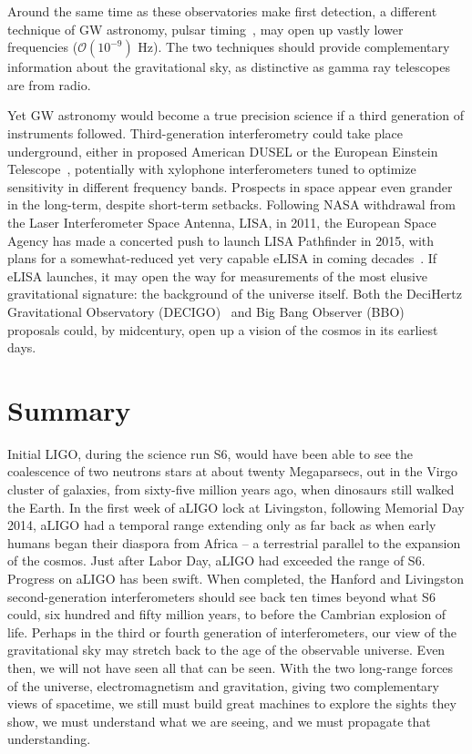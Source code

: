 Around the same time as these observatories make first detection, a different technique of GW astronomy, pulsar timing~\cite{Hobbs2010}, may open up vastly lower frequencies ($\mathcal{O}(10^{-9})$ Hz).
The two techniques should provide complementary information about the gravitational sky, as distinctive as gamma ray telescopes are from radio.

Yet GW astronomy would become a true precision science if a third generation of instruments followed.
Third-generation interferometry could take place underground, either in proposed American DUSEL or the European Einstein Telescope~\cite{Punturo2010}, potentially with xylophone interferometers tuned to optimize sensitivity in different frequency bands.
Prospects in space appear even grander in the long-term, despite short-term setbacks. 
Following NASA withdrawal from the Laser Interferometer Space Antenna, LISA, in 2011, the European Space Agency has made a concerted push to launch LISA Pathfinder in 2015, with plans for a somewhat-reduced yet very capable eLISA in coming decades~\cite{Vitale2014}.
If eLISA launches, it may open the way for measurements of the most elusive gravitational signature: the background of the universe itself.
Both the DeciHertz Gravitational Observatory (DECIGO)~\cite{Ando2010} and Big Bang Observer (BBO)~\cite{Harry2006} proposals could, by midcentury, open up a vision of the cosmos in its earliest days.

    \section{Summary}
    \label{intro_summary}
 

Initial LIGO, during the science run S6, would have been able to see the coalescence of two neutrons stars at about twenty Megaparsecs, out in the Virgo cluster of galaxies, from sixty-five million years ago, when dinosaurs still walked the Earth. 
In the first week of aLIGO lock at Livingston, following Memorial Day 2014, aLIGO had a temporal range extending only as far back as when early humans began their diaspora from Africa -- a terrestrial parallel to the expansion of the cosmos.
Just after Labor Day, aLIGO had exceeded the range of S6.
Progress on aLIGO has been swift.
When completed, the Hanford and Livingston second-generation interferometers should see back ten times beyond what S6 could, six hundred and fifty million years, to before the Cambrian explosion of life.
Perhaps in the third or fourth generation of interferometers, our view of the gravitational sky may stretch back to the age of the observable universe.
Even then, we will not have seen all that can be seen.
With the two long-range forces of the universe, electromagnetism and gravitation, giving two complementary views of spacetime, we still must build great machines to explore the sights they show, we must understand what we are seeing, and we must propagate that understanding. 

